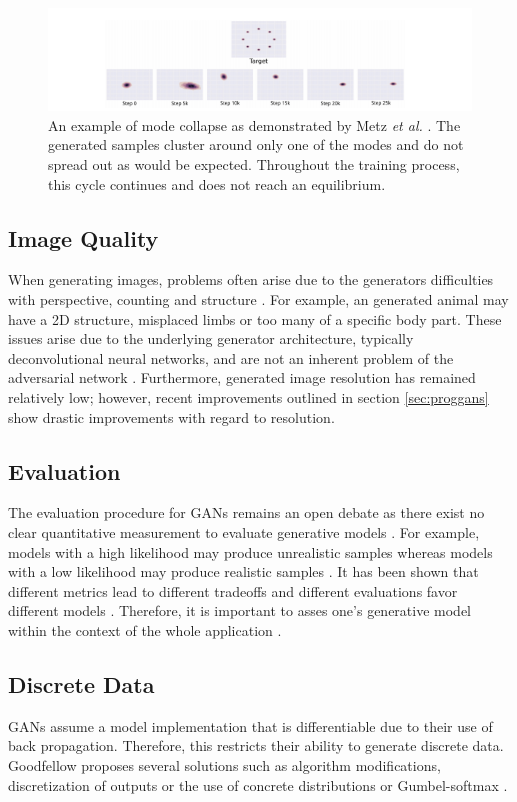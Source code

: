 \documentclass[11pt]{article}
\begin{document}
\begin{figure}
\centering
\includegraphics[scale=0.8]{modecollapse}
\caption{An example of mode collapse as demonstrated by Metz \textit{et al.} \citep{2016arXiv161102163M}. The generated samples cluster around only one of the modes and do not spread out as would be expected. Throughout the training process, this cycle continues and does not reach an equilibrium.}
\label{fig:modecollapse}
\end{figure}

\subsection{Image Quality}
When generating images, problems often arise due to the generators difficulties with perspective, counting and structure \citep{2017arXiv170100160G}. For example, an generated animal may  have a 2D structure, misplaced limbs or too many of a specific body part. These issues arise due to the underlying generator architecture, typically deconvolutional neural networks, and are not an inherent problem of the adversarial network \citep{2017arXiv170100160G}. Furthermore, generated image resolution has remained relatively low; however, recent improvements outlined in section \ref{sec:proggans} show drastic improvements with regard to resolution.

\subsection{Evaluation}
The evaluation procedure for GANs remains an open debate as there exist no clear quantitative measurement to evaluate generative models \citep{2017arXiv170100160G}. For example, models with a high likelihood may produce unrealistic samples whereas models with a low likelihood may produce realistic samples \citep{2017arXiv170100160G}. It has been shown that different metrics lead to different tradeoffs and different evaluations favor different models \citep{2015arXiv151101844T}. Therefore, it is important to asses one's generative model within the context of the whole application \citep{2015arXiv151101844T}.

\subsection{Discrete Data}
GANs assume a model implementation that is differentiable due to their use of back propagation. Therefore, this restricts their ability to generate discrete data. Goodfellow proposes several solutions such as algorithm modifications, discretization of outputs or the use of concrete distributions or Gumbel-softmax \citep{2017arXiv170100160G}.
\end{document}
